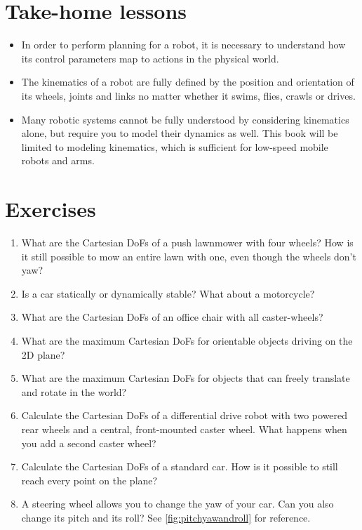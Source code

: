 


\section*{Take-home lessons}

\begin{itemize}
\item In order to perform planning for a robot, it is necessary to understand how its control parameters map to actions in the physical world.
\item The kinematics of a robot are fully defined by the position and orientation of its wheels, joints and links no matter whether it swims, flies, crawls or drives.
\item Many robotic systems cannot be fully understood by considering kinematics alone, but require you to model their dynamics as well. This book will be limited to modeling kinematics, which is sufficient for low-speed mobile robots and arms.
\end{itemize}


\section*{Exercises}\small
\begin{enumerate}
\item What are the Cartesian DoFs of a push lawnmower with four wheels? How is it still possible to mow an entire lawn with one, even though the wheels don't yaw?
\item Is a car statically or dynamically stable? What about a motorcycle?
\item What are the Cartesian DoFs of an office chair with all caster-wheels?
\item What are the maximum Cartesian DoFs for orientable objects driving on the 2D plane?
\item What are the maximum Cartesian DoFs for objects that can freely translate and rotate in the world?
\item Calculate the Cartesian DoFs of a differential drive robot with two powered rear wheels and a central, front-mounted caster wheel. What happens when you add a second caster wheel?
\item Calculate the Cartesian DoFs of a standard car. How is it possible to still reach every point on the plane?
\item A steering wheel allows you to change the yaw of your car. Can you also change its pitch and its roll? See \cref{fig:pitchyawandroll} for reference.
\end{enumerate}\normalsize

